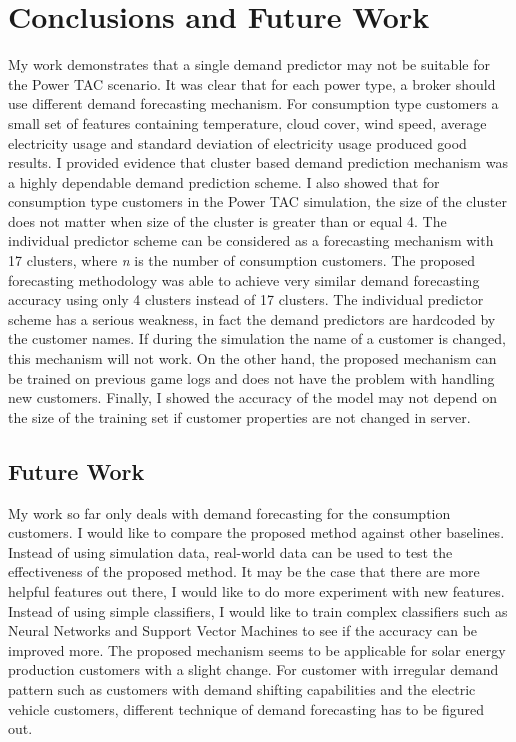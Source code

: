 
\chapter{Conclusions and Future Work}

My work demonstrates that a single demand predictor may not be suitable for the Power TAC scenario. It was clear that for each power type, a broker should use different demand forecasting mechanism. For consumption type customers a small set of features containing temperature, cloud cover, wind speed, average electricity usage and standard deviation of electricity usage produced good results. I provided evidence that cluster based demand prediction mechanism was a highly dependable demand prediction scheme. I also showed that for consumption type customers in the Power TAC simulation, the size of the cluster does not matter when size of the cluster is greater than or equal 4. The individual predictor scheme can be considered as a forecasting mechanism with 17 clusters, where \textit{n} is the number of consumption customers. The proposed forecasting methodology was able to achieve very similar demand forecasting accuracy using only 4 clusters instead of 17 clusters. The individual predictor scheme has a serious weakness, in fact the demand predictors are hardcoded by the customer names. If during the simulation the name of a customer is changed, this mechanism will not work. On the other hand, the proposed mechanism can be trained on previous game logs and does not have the problem with handling new customers. Finally, I showed the accuracy of the model may not depend on the size of the training set if customer properties are not changed in server.

\section{Future Work}

My work so far only deals with demand forecasting for the consumption customers. I would like to compare the proposed method against other baselines. Instead of using simulation data, real-world data can be used to test the effectiveness of the proposed method. It may be the case that there are more helpful features out there, I would like to do more experiment with new features. Instead of using simple classifiers, I would like to train complex classifiers such as Neural Networks \cite{witten2005data} and Support Vector Machines \cite{witten2005data} to see if the accuracy can be improved more.  The proposed mechanism seems to be applicable for solar energy production customers with a slight change. For customer with irregular demand pattern such as customers with demand shifting capabilities and the electric vehicle customers, different technique of demand forecasting has to be figured out. 

